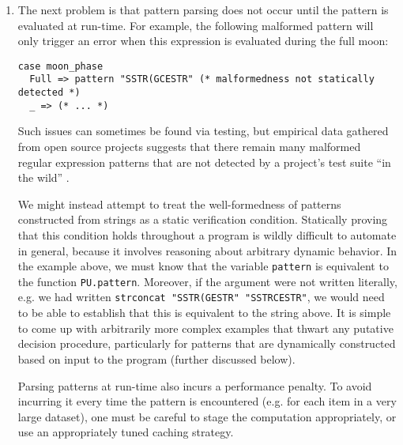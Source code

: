 \begin{enumerate}
\item The next problem is that pattern parsing does not occur until the pattern is evaluated at run-time. For example, the following malformed pattern will only trigger an error when this expression is evaluated during the full moon: %

\begin{lstlisting}[numbers=none]
case moon_phase
  Full => pattern "SSTR(GCESTR" (* malformedness not statically detected *)
  _ => (* ... *)
\end{lstlisting}
Such issues can sometimes be found via testing, but empirical data gathered from open source projects suggests that there remain many malformed regular expression patterns that are not detected by a project's test suite ``in the wild'' \cite{spishak2012type}. 

We might instead attempt to treat the well-formedness of patterns constructed from strings as a static verification condition. Statically proving that this condition holds throughout a program is wildly difficult to automate in general, because it involves reasoning about arbitrary dynamic behavior. In the example above, we must know that the variable \lstinline{pattern} is equivalent to the function \lstinline{PU.pattern}. Moreover, if the argument were not written literally, e.g. we had written \lstinline{strconcat "SSTR(GESTR" "SSTRCESTR"}, we would need to be able to establish that this is equivalent to the string above. It is simple to come up with arbitrarily more complex examples that thwart any putative decision procedure, particularly for patterns that are dynamically constructed based on input to the program (further discussed below).

Parsing patterns at run-time also incurs a performance penalty. To avoid incurring it every time the pattern is encountered (e.g. for each item in a very large dataset), one must be careful to stage the computation appropriately, or use an appropriately tuned caching strategy. %


\end{enumerate}
